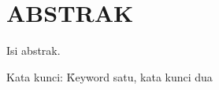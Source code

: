 %
%
%


\chapter*{ABSTRAK}


\singlespacing

\vspace*{0.5cm}

\noindent Isi abstrak.

\vspace*{0.2cm}

\noindent Kata kunci: \f{Keyword} satu, kata kunci dua

\newpage
